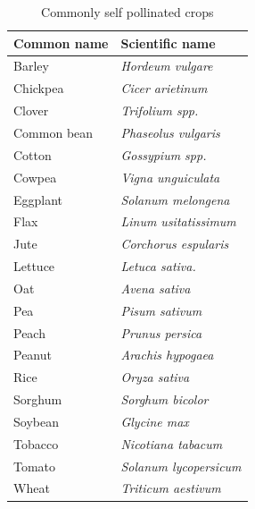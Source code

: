 \documentclass[11pt,ignorenonframetext,aspectratio=169]{beamer}
\begin{document}
\begin{frame}{}
\protect\hypertarget{section-22}{}
\begin{table}

\caption{\label{tab:predominantly-self-pollinated}Commonly self pollinated crops}
\centering
\fontsize{6}{8}\selectfont
\begin{tabular}[t]{ll}
\toprule
Common name & Scientific name\\
\midrule
Barley & \textit{Hordeum vulgare}\\
Chickpea & \textit{Cicer arietinum}\\
Clover & \textit{Trifolium spp.}\\
Common bean & \textit{Phaseolus vulgaris}\\
Cotton & \textit{Gossypium spp.}\\
\addlinespace
Cowpea & \textit{Vigna unguiculata}\\
Eggplant & \textit{Solanum melongena}\\
Flax & \textit{Linum usitatissimum}\\
Jute & \textit{Corchorus espularis}\\
Lettuce & \textit{Letuca sativa.}\\
\addlinespace
Oat & \textit{Avena sativa}\\
Pea & \textit{Pisum sativum}\\
Peach & \textit{Prunus persica}\\
Peanut & \textit{Arachis hypogaea}\\
Rice & \textit{Oryza sativa}\\
\addlinespace
Sorghum & \textit{Sorghum bicolor}\\
Soybean & \textit{Glycine max}\\
Tobacco & \textit{Nicotiana tabacum}\\
Tomato & \textit{Solanum lycopersicum}\\
Wheat & \textit{Triticum aestivum}\\
\bottomrule
\end{tabular}
\end{table}
\end{frame}
\end{document}

